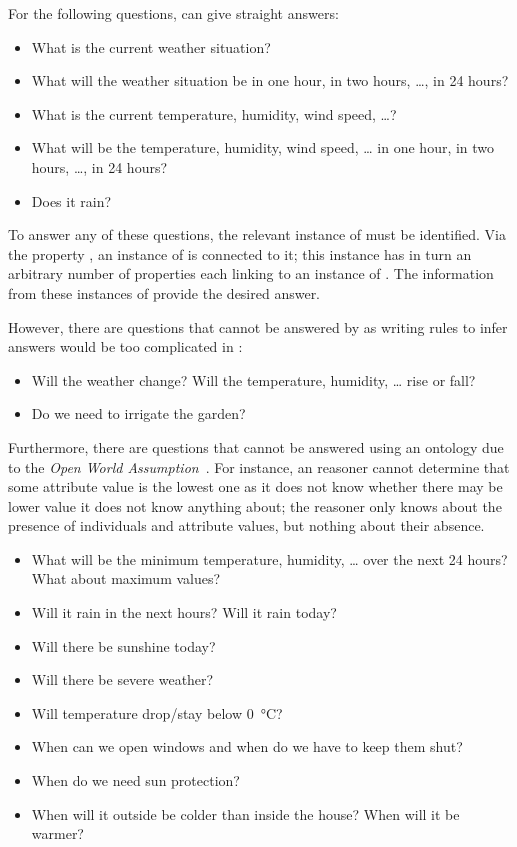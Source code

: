 For the following questions, \smarthomeweather can give straight answers:
\begin{itemize}
  \item What is the current weather situation?
  \item What will the weather situation be in one hour, in two hours, …, in 24 hours?
  \item What is the current temperature, humidity, wind speed, …?
  \item What will be the temperature, humidity, wind speed, … in one hour, in two hours, …, in 24 hours?
  \item Does it rain?
\end{itemize}
To answer any of these questions, the relevant instance of  must be identified. Via the property , an instance of  is connected to it; this instance has in turn an arbitrary number of  properties each linking to an instance of . The information from these instances of  provide the desired answer.

However, there are questions that cannot be answered by \smarthomeweather as writing rules to infer answers would be too complicated in :
\begin{itemize}
  \item Will the weather change? Will the temperature, humidity, … rise or fall?
  \item Do we need to irrigate the garden?
\end{itemize}

Furthermore, there are questions that cannot be answered using an  ontology due to the \emph{Open World Assumption}~\cite{open_world_assumption1}. For instance, an  reasoner cannot determine that some attribute value is the lowest one as it does not know whether there may be lower value it does not know anything about; the reasoner only knows about the presence of individuals and attribute values, but nothing about their absence.

\begin{itemize}
  \item What will be the minimum temperature, humidity, … over the next 24 hours? What about maximum values?
  \item Will it rain in the next hours? Will it rain today?
  \item Will there be sunshine today?
  \item Will there be severe weather?
  \item Will temperature drop/stay below \SI{0}{\celsius}?
  \item When can we open windows and when do we have to keep them shut?
  \item When do we need sun protection?
  \item When will it outside be colder than inside the house? When will it be warmer?
\end{itemize}

